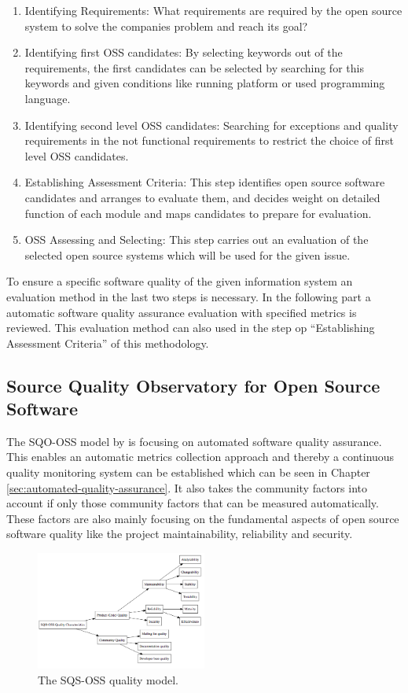\documentclass[DIV=calc,paper=a4,fontsize=9pt,twocolumn]{scrartcl}
\begin{document}
\begin{enumerate}
    \item Identifying Requirements: What requirements are required by the open source system to solve the companies problem and reach its goal?
    \item Identifying first OSS candidates: By selecting keywords out of the requirements, the first candidates can be selected by searching for this keywords and given conditions like running platform or used programming language.
    \item Identifying second level OSS candidates: Searching for exceptions and quality requirements in the not functional requirements to restrict the choice of first level OSS candidates.
    \item Establishing Assessment Criteria: This step identifies open source software candidates and arranges to evaluate them, and decides weight on detailed function of each module and maps candidates to prepare for evaluation.
    \item OSS Assessing and Selecting: This step carries out an evaluation of the selected open source systems which will be used for the given issue. 
\end{enumerate}

To ensure a specific software quality of the given information system an evaluation method in the last two steps is necessary. In the following part a automatic software quality assurance evaluation with specified metrics is reviewed. This evaluation method can also used in the step op \enquote{Establishing Assessment Criteria} of this methodology.

\subsection{Source Quality Observatory for Open Source Software}\label{sec:sqsoss}

The SQO-OSS model by \citet{samoladas2008sqo} is focusing on automated software quality assurance. This enables an automatic metrics collection approach and thereby a continuous quality monitoring system can be established which can be seen in Chapter \ref{sec:automated-quality-assurance}. It also takes the community factors into account if only those community factors that can be measured automatically. These factors are also mainly focusing on the fundamental aspects of open source software quality like the project maintainability, reliability and security. 

\begin{figure}[ht]
    \includegraphics[width=0.5\textwidth ]{img/sqsoss.png}{}
    \centering
    \caption{The SQS-OSS quality model. \citet{samoladas2008sqo}}\label{fig:sqs-oss}
\end{figure}
\end{document}
